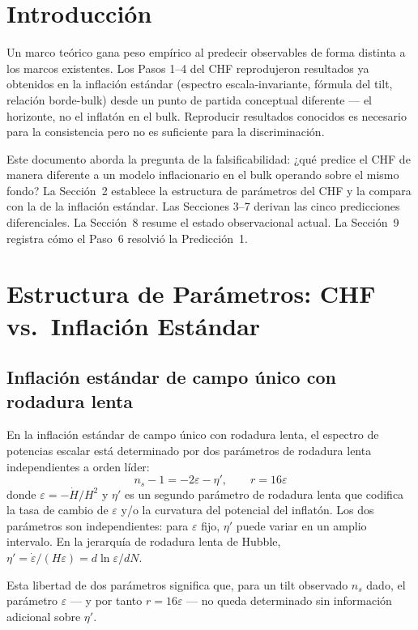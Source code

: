 \documentclass[12pt,a4paper]{article}
\begin{document}
\section{Introducción}

Un marco teórico gana peso empírico al predecir observables de forma distinta a los marcos existentes. Los Pasos 1--4 del CHF reprodujeron resultados ya obtenidos en la inflación estándar (espectro escala-invariante, fórmula del tilt, relación borde-bulk) desde un punto de partida conceptual diferente --- el horizonte, no el inflatón en el bulk. Reproducir resultados conocidos es necesario para la consistencia pero no es suficiente para la discriminación.

Este documento aborda la pregunta de la falsificabilidad: ¿qué predice el CHF de manera diferente a un modelo inflacionario en el bulk operando sobre el mismo fondo? La Sección~2 establece la estructura de parámetros del CHF y la compara con la de la inflación estándar. Las Secciones 3--7 derivan las cinco predicciones diferenciales. La Sección~8 resume el estado observacional actual. La Sección~9 registra cómo el Paso~6 resolvió la Predicción~1.

\section{Estructura de Parámetros: CHF vs.\ Inflación Estándar}

\subsection{Inflación estándar de campo único con rodadura lenta}

En la inflación estándar de campo único con rodadura lenta, el espectro de potencias escalar está determinado por dos parámetros de rodadura lenta independientes a orden líder:
\begin{equation}
n_s - 1 = -2\varepsilon - \eta', \qquad r = 16\varepsilon \tag{1}
\end{equation}
donde $\varepsilon = -\dot{H}/H^2$ y $\eta'$ es un segundo parámetro de rodadura lenta que codifica la tasa de cambio de $\varepsilon$ y/o la curvatura del potencial del inflatón. Los dos parámetros son independientes: para $\varepsilon$ fijo, $\eta'$ puede variar en un amplio intervalo. En la jerarquía de rodadura lenta de Hubble, $\eta' = \dot{\varepsilon}/(H\varepsilon) = d\ln\varepsilon/dN$.

Esta libertad de dos parámetros significa que, para un tilt observado $n_s$ dado, el parámetro $\varepsilon$ --- y por tanto $r = 16\varepsilon$ --- no queda determinado sin información adicional sobre $\eta'$.
\end{document}
